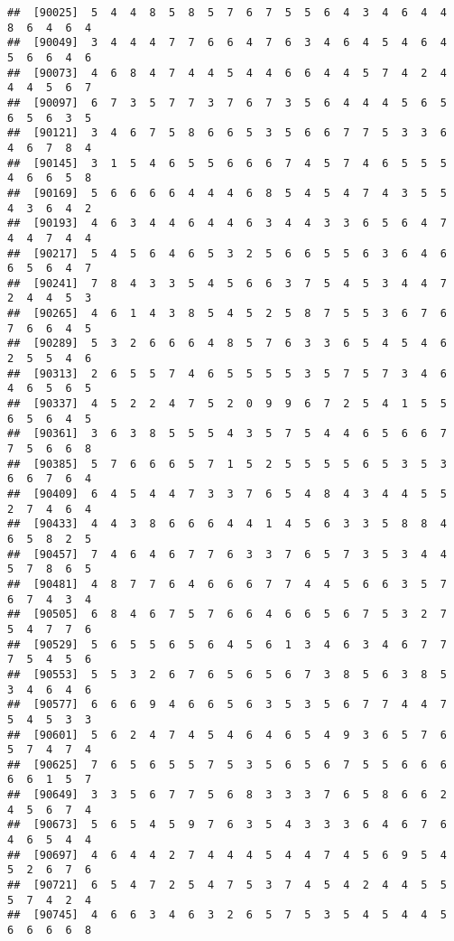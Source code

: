 \documentclass[
]{book}
\begin{document}
\begin{verbatim}
##  [90025]  5  4  4  8  5  8  5  7  6  7  5  5  6  4  3  4  6  4  4  8  6  4  6  4
##  [90049]  3  4  4  4  7  7  6  6  4  7  6  3  4  6  4  5  4  6  4  5  6  6  4  6
##  [90073]  4  6  8  4  7  4  4  5  4  4  6  6  4  4  5  7  4  2  4  4  4  5  6  7
##  [90097]  6  7  3  5  7  7  3  7  6  7  3  5  6  4  4  4  5  6  5  6  5  6  3  5
##  [90121]  3  4  6  7  5  8  6  6  5  3  5  6  6  7  7  5  3  3  6  4  6  7  8  4
##  [90145]  3  1  5  4  6  5  5  6  6  6  7  4  5  7  4  6  5  5  5  4  6  6  5  8
##  [90169]  5  6  6  6  6  4  4  4  6  8  5  4  5  4  7  4  3  5  5  4  3  6  4  2
##  [90193]  4  6  3  4  4  6  4  4  6  3  4  4  3  3  6  5  6  4  7  4  4  7  4  4
##  [90217]  5  4  5  6  4  6  5  3  2  5  6  6  5  5  6  3  6  4  6  6  5  6  4  7
##  [90241]  7  8  4  3  3  5  4  5  6  6  3  7  5  4  5  3  4  4  7  2  4  4  5  3
##  [90265]  4  6  1  4  3  8  5  4  5  2  5  8  7  5  5  3  6  7  6  7  6  6  4  5
##  [90289]  5  3  2  6  6  6  4  8  5  7  6  3  3  6  5  4  5  4  6  2  5  5  4  6
##  [90313]  2  6  5  5  7  4  6  5  5  5  5  3  5  7  5  7  3  4  6  4  6  5  6  5
##  [90337]  4  5  2  2  4  7  5  2  0  9  9  6  7  2  5  4  1  5  5  6  5  6  4  5
##  [90361]  3  6  3  8  5  5  5  4  3  5  7  5  4  4  6  5  6  6  7  7  5  6  6  8
##  [90385]  5  7  6  6  6  5  7  1  5  2  5  5  5  5  6  5  3  5  3  6  6  7  6  4
##  [90409]  6  4  5  4  4  7  3  3  7  6  5  4  8  4  3  4  4  5  5  2  7  4  6  4
##  [90433]  4  4  3  8  6  6  6  4  4  1  4  5  6  3  3  5  8  8  4  6  5  8  2  5
##  [90457]  7  4  6  4  6  7  7  6  3  3  7  6  5  7  3  5  3  4  4  5  7  8  6  5
##  [90481]  4  8  7  7  6  4  6  6  6  7  7  4  4  5  6  6  3  5  7  6  7  4  3  4
##  [90505]  6  8  4  6  7  5  7  6  6  4  6  6  5  6  7  5  3  2  7  5  4  7  7  6
##  [90529]  5  6  5  5  6  5  6  4  5  6  1  3  4  6  3  4  6  7  7  7  5  4  5  6
##  [90553]  5  5  3  2  6  7  6  5  6  5  6  7  3  8  5  6  3  8  5  3  4  6  4  6
##  [90577]  6  6  6  9  4  6  6  5  6  3  5  3  5  6  7  7  4  4  7  5  4  5  3  3
##  [90601]  5  6  2  4  7  4  5  4  6  4  6  5  4  9  3  6  5  7  6  5  7  4  7  4
##  [90625]  7  6  5  6  5  5  7  5  3  5  6  5  6  7  5  5  6  6  6  6  6  1  5  7
##  [90649]  3  3  5  6  7  7  5  6  8  3  3  3  7  6  5  8  6  6  2  4  5  6  7  4
##  [90673]  5  6  5  4  5  9  7  6  3  5  4  3  3  3  6  4  6  7  6  4  6  5  4  4
##  [90697]  4  6  4  4  2  7  4  4  4  5  4  4  7  4  5  6  9  5  4  5  2  6  7  6
##  [90721]  6  5  4  7  2  5  4  7  5  3  7  4  5  4  2  4  4  5  5  5  7  4  2  4
##  [90745]  4  6  6  3  4  6  3  2  6  5  7  5  3  5  4  5  4  4  5  6  6  6  6  8

\end{verbatim}
\end{document}

